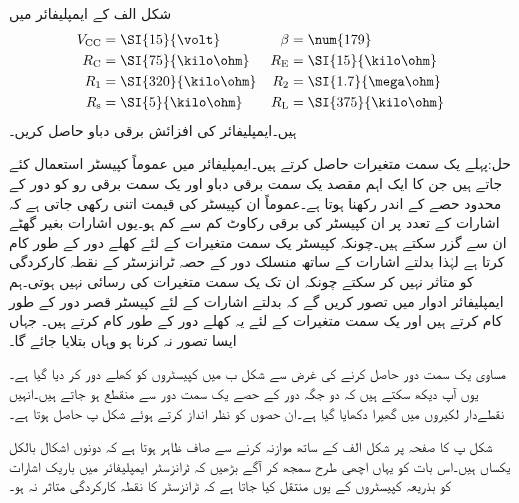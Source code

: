  
شکل  الف کے ایمپلیفائر میں
\begin{align*}
V_{\textup{CC}} &=\SI{15}{\volt} & \beta&=\num{179}\\
R_{\textup{C}} &=\SI{75}{\kilo \ohm} &  R_{\textup{E}} &=\SI{15}{\kilo \ohm}\\
R_{\textup{1}} &=\SI{320}{\kilo \ohm} & R_{\textup{2}} &=\SI{1.7}{\mega \ohm}\\
R_{\textup{s}} &=\SI{5}{\kilo \ohm} & R_{\textup{L}} &=\SI{375}{\kilo \ohm}
\end{align*}
ہیں۔ایمپلیفائر کی افزائش برقی دباو   حاصل کریں۔

حل:پہلے یک سمت متغیرات حاصل کرتے ہیں۔ایمپلیفائر میں عموماً کپیسٹر استعمال کئے جاتے ہیں جن کا ایک اہم مقصد یک سمت برقی دباو اور یک سمت برقی رو کو دور کے محدود حصے کے اندر رکھنا ہوتا ہے۔عموماً ان کپیسٹر کی قیمت اتنی رکھی جاتی ہے کہ اشارات کے تعدد پر ان کپیسٹر کی برقی رکاوٹ کم سے کم ہو۔یوں اشارات بغیر گھٹے ان سے گزر سکتے ہیں۔چونکہ کپیسٹر یک سمت متغیرات کے لئے کھلے دور کے طور کام کرتا ہے لہٰذا بدلتے اشارات کے ساتھ منسلک دور کے حصہ ٹرانزسٹر کے نقطہ کارکردگی کو متاثر نہیں کر سکتے چونکہ ان تک یک سمت متغیرات کی رسائی نہیں ہوتی۔ہم ایمپلیفائر ادوار میں تصور کریں گے کہ بدلتے اشارات کے لئے کپیسٹر قصر دور کے طور کام کرتے ہیں اور یک سمت متغیرات کے لئے یہ کھلے دور کے طور کام کرتے ہیں۔ جہاں ایسا تصور نہ کرنا ہو وہاں بتلایا جائے گا۔

مساوی یک سمت دور حاصل کرنے کی غرض سے شکل  ب میں کپیسٹروں کو کھلے دور کر دیا گیا ہے۔یوں آپ دیکھ سکتے ہیں کہ دو جگہ دور کے حصے یک سمت دور سے منقطع ہو جاتے ہیں۔انہیں نقطےدار لکیروں میں گھیرا دکھایا گیا ہے۔ان حصوں کو نظر انداز کرتے ہوئے شکل  پ حاصل ہوتا ہے۔

شکل  پ کا صفحہ \pageref{شکل_ایک_عدد_پیداکار_برقی_دباو_سے_مائل}  پر شکل  الف کے ساتھ موازنہ کرنے سے صاف ظاہر ہوتا ہے کہ دونوں اشکال بالکل یکساں ہیں۔اس بات کو یہاں اچھی طرح سمجھ کر آگے بڑھیں کہ ٹرانزسٹر ایمپلیفائر میں باریک اشارات کو بذریعہ کپیسٹروں کے یوں منتقل کیا جاتا ہے کہ ٹرانزسٹر کا نقطہ کارکردگی متاثر نہ ہو۔

